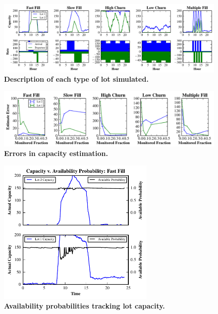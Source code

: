 \begin{figure}
\centering
\includegraphics[width=\textwidth]{./simulator/figures/lots.pdf}

\caption{\textbf{Description of each type of lot simulated.} }

\label{fig-lotsdescription}
\end{figure}

\begin{figure}
\centering
\includegraphics[width=\textwidth]{./simulator/figures/capacity_experiment.pdf}

\caption{\textbf{Errors in capacity estimation.} }

\label{fig-capacityerrors}
\end{figure}

\begin{figure}
\centering
\includegraphics[width=3.0in]{./simulator/figures/tracking_fastfill.pdf}

\caption{\textbf{Availability probabilities tracking lot capacity.} }

\label{fig-trackingexample}
\end{figure}


